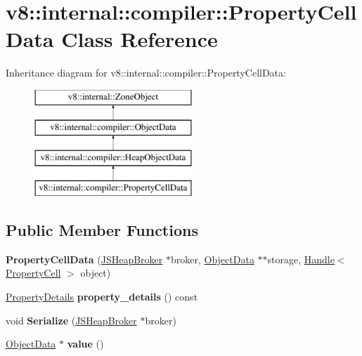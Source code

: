 \hypertarget{classv8_1_1internal_1_1compiler_1_1PropertyCellData}{}\section{v8\+:\+:internal\+:\+:compiler\+:\+:Property\+Cell\+Data Class Reference}
\label{classv8_1_1internal_1_1compiler_1_1PropertyCellData}
Inheritance diagram for v8\+:\+:internal\+:\+:compiler\+:\+:Property\+Cell\+Data\+:\begin{figure}[H]
\begin{center}
\leavevmode
\includegraphics[height=4.000000cm]{classv8_1_1internal_1_1compiler_1_1PropertyCellData}
\end{center}
\end{figure}
\subsection*{Public Member Functions}
\begin{DoxyCompactItemize}
\item 
\mbox{\label{classv8_1_1internal_1_1compiler_1_1PropertyCellData_a485b8ca6a23652c83226ce4d452b730e}} 
{\bfseries Property\+Cell\+Data} (\mbox{\hyperlink{classv8_1_1internal_1_1compiler_1_1JSHeapBroker}{J\+S\+Heap\+Broker}} $\ast$broker, \mbox{\hyperlink{classv8_1_1internal_1_1compiler_1_1ObjectData}{Object\+Data}} $\ast$$\ast$storage, \mbox{\hyperlink{classv8_1_1internal_1_1Handle}{Handle}}$<$ \mbox{\hyperlink{classv8_1_1internal_1_1PropertyCell}{Property\+Cell}} $>$ object)
\item 
\mbox{\label{classv8_1_1internal_1_1compiler_1_1PropertyCellData_a0d300a58198761c463a0d5342cde2435}} 
\mbox{\hyperlink{classv8_1_1internal_1_1PropertyDetails}{Property\+Details}} {\bfseries property\+\_\+details} () const
\item 
\mbox{\label{classv8_1_1internal_1_1compiler_1_1PropertyCellData_ae3b1e23917f9554091f1fbf91da1364c}} 
void {\bfseries Serialize} (\mbox{\hyperlink{classv8_1_1internal_1_1compiler_1_1JSHeapBroker}{J\+S\+Heap\+Broker}} $\ast$broker)
\item 
\mbox{\label{classv8_1_1internal_1_1compiler_1_1PropertyCellData_a2bc97fd60f73b850885954015c529820}} 
\mbox{\hyperlink{classv8_1_1internal_1_1compiler_1_1ObjectData}{Object\+Data}} $\ast$ {\bfseries value} ()
\end{DoxyCompactItemize}
